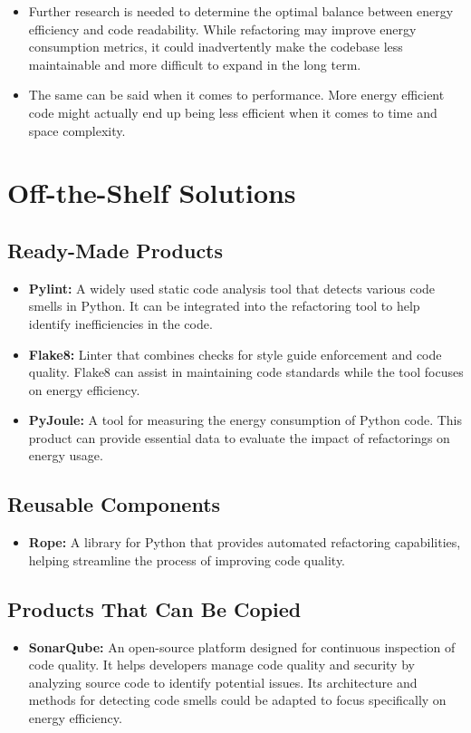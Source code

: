 \documentclass[12pt]{article}
\begin{document}
\begin{itemize}
  \item Further research is needed to determine the optimal balance between energy efficiency and code readability. While refactoring may improve energy consumption metrics, it could inadvertently make the codebase less maintainable and more difficult to expand in the long term.
  \item The same can be said when it comes to performance. More energy efficient code might actually end up being less efficient when it comes to time and space complexity.
\end{itemize}

\section{Off-the-Shelf Solutions}
\subsection{Ready-Made Products}

\begin{itemize}
  \item \textbf{Pylint:} A widely used static code analysis tool that detects various code smells in Python. It can be integrated into the refactoring tool to help identify inefficiencies in the code.
  \item \textbf{Flake8:} Linter that combines checks for style guide enforcement and code quality. Flake8 can assist in maintaining code standards while the tool focuses on energy efficiency.
  \item \textbf{PyJoule:} A tool for measuring the energy consumption of Python code. This product can provide essential data to evaluate the impact of refactorings on energy usage.
\end{itemize}

\subsection{Reusable Components}
\begin{itemize}
  \item \textbf{Rope:} A library for Python that provides automated refactoring capabilities, helping streamline the process of improving code quality.
\end{itemize}
\subsection{Products That Can Be Copied}
\begin{itemize}
  \item \textbf{SonarQube:} An open-source platform designed for continuous inspection of code quality. It helps developers manage code quality and security by analyzing source code to identify potential issues. Its architecture and methods for detecting code smells could be adapted to focus specifically on energy efficiency. 
\end{itemize}
\end{document}
